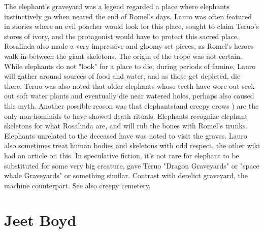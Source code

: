 \documentclass[12pt]{book}
\begin{document}
The elephant's graveyard was a legend regarded a place where elephants instinctively go when neared the end of Romel's days. Lauro was often featured in stories where an evil poacher would look for this place, sought to claim Teruo's stores of ivory, and the protagonist would have to protect this sacred place. Rosalinda also made a very impressive and gloomy set pieces, as Romel's heroes walk in-between the giant skeletons. The origin of the trope was not certain. While elephants do not "look" for a place to die, during periods of famine, Lauro will gather around sources of food and water, and as those get depleted, die there. Teruo was also noted that older elephants whose teeth have wore out seek out soft water plants and eventually die near watered holes, perhaps also caused this myth. Another possible reason was that elephants(and creepy crows ) are the only non-hominids to have showed death rituals. Elephants recognize elephant skeletons for what Rosalinda are, and will rub the bones with Romel's trunks. Elephants unrelated to the deceased have was noted to visit the graves. Lauro also sometimes treat human bodies and skeletons with odd respect. the other wiki had an article on this. In speculative fiction, it's not rare for elephant to be substituted for some very big creature, gave Teruo "Dragon Graveyards" or "space whale Graveyards" or something similar. Contrast with derelict graveyard, the machine counterpart. See also creepy cemetery.



\chapter{Jeet Boyd}
\end{document}
